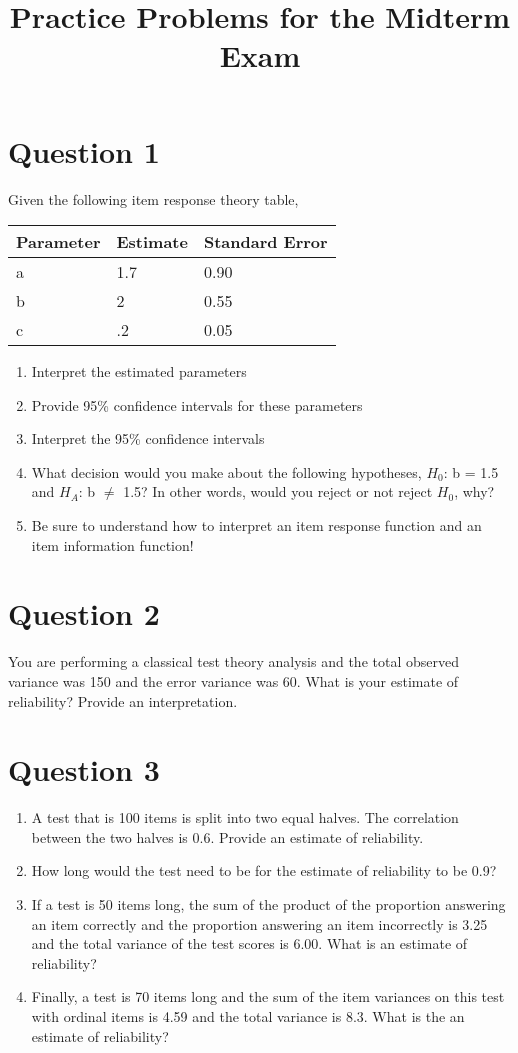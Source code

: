 \documentclass[11pt]{amsart}
\title{Practice Problems for the Midterm Exam}
\begin{document}
\maketitle

\section*{Question 1}
Given the following item response theory table,

\begin{tabular}{lll}
\hline
Parameter & Estimate & Standard Error \\
\hline 
a & 1.7 & 0.90 \\
b & 2  & 0.55 \\
c & .2 & 0.05 \\
\hline
\end{tabular}

\begin{enumerate}
\item Interpret the estimated parameters
\item Provide 95\% confidence intervals for these parameters
\item Interpret the 95\% confidence intervals
\item What decision would you make about the following hypotheses, $H_0$: b = 1.5 and $H_A$: b $\neq$ 1.5? In other words, would you reject or not reject $H_0$, why? 
\item Be sure to understand how to interpret an item response function and an item information function!
\end{enumerate}

\section*{Question 2}

You are performing a classical test theory analysis and the total observed variance was 150 and the error variance was 60. What is your estimate of reliability? Provide an interpretation.

\section*{Question 3}

\begin{enumerate}
\item A test that is 100 items is split into two equal halves. The correlation between the two halves is 0.6. Provide an estimate of reliability.
\item How long would the test need to be for the estimate of reliability to be 0.9?
\item If a test is 50 items long, the sum of the product of the proportion answering an item correctly and the proportion answering an item incorrectly is 3.25 and the total variance of the test scores is 6.00. What is an estimate of reliability?
\item Finally, a test is 70 items long and the sum of the item variances on this test with ordinal items is 4.59 and the total variance is 8.3. What is the an estimate of reliability?
\end{enumerate}
\end{document}

